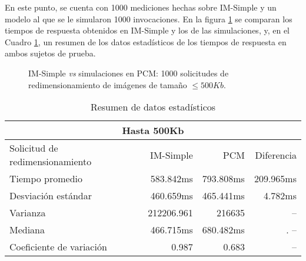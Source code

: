 En este punto, se cuenta con 1000 mediciones hechas sobre IM-Simple y un modelo al que se le simularon 1000 invocaciones. En la figura \ref{fig:comparacion-imsimple-palladio-500kb} se comparan los tiempos de respuesta obtenidos en IM-Simple y los de las simulaciones, y, en el Cuadro \ref{table:datos-estadisticos-hasta-500kb}, un resumen de los datos estadísticos de los tiempos de respuesta en ambos sujetos de prueba.

\begin{figure}[h]
\hspace{-3cm}
\caption{IM-Simple \emph{vs} simulaciones en PCM: 1000 solicitudes de redimensionamiento de imágenes de tamaño $\leq 500Kb$.}
\label{fig:comparacion-imsimple-palladio-500kb}
\end{figure}

\hspace{-4cm}
\begin{table}
    \centering
    \begin{tabular}{l|r|r|r}
        \toprule[1.5pt]
        \multicolumn{4}{c}{\textbf{Hasta 500Kb}} \\
        \midrule
        Solicitud de redimensionamiento  & IM-Simple & PCM & Diferencia\\
        \midrule
        Tiempo promedio  & 583.842ms & 793.808ms & 209.965ms\\
        Desviación estándar & 460.659ms & 465.441ms & 4.782ms\\
        Varianza & 212206.961 & 216635 & -- \\
        Mediana & 466.715ms & 680.482ms &. -- \\
        Coeficiente de variación & 0.987 & 0.683 & -- \\                       
        \bottomrule[1.5pt]
    \end{tabular}
    \caption{Resumen de datos estadísticos}
    \label{table:datos-estadisticos-hasta-500kb}
\end{table}

